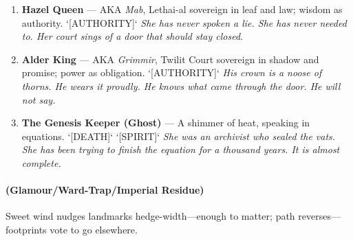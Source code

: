 \begin{enumerate}
\item[Q] \textbf{Hazel Queen} --- AKA \textit{Mab}, Lethai-al sovereign in leaf and law; wisdom as authority. `[AUTHORITY]`
  \hfill \textit{She has never spoken a lie. She has never needed to. Her court sings of a door that should stay closed.}
\item[K] \textbf{Alder King} --- AKA \textit{Grimmir}, Twilit Court sovereign in shadow and promise; power as obligation. `[AUTHORITY]`
  \hfill \textit{His crown is a noose of thorns. He wears it proudly. He knows what came through the door. He will not say.}
\item[A] \textbf{The Genesis Keeper (Ghost)} --- A shimmer of heat, speaking in equations. `[DEATH]` `[SPIRIT]`
  \hfill \textit{She was an archivist who sealed the vats. She has been trying to finish the equation for a thousand years. It is almost complete.}
\end{enumerate}

\paragraph*{(Glamour/Ward-Trap/Imperial Residue)} Sweet wind nudges landmarks hedge-width---enough to matter; path reverses---footprints vote to go elsewhere.

